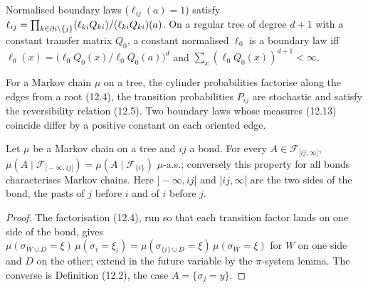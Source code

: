 \begin{proposition}[Georgii (12.15)--(12.17)]
    \label{prop:tr-12-16}
    \leanok

    Normalised boundary laws ($\ell_{ij}(a) = 1$) satisfy $\ell_{ij} = \prod_{k \in \partial i \setminus\left\{ j \right\}}(\ell_{ki}Q_{ki})/(\ell_{ki}Q_{ki})(a)$.
    On a regular tree of degree $d + 1$ with a constant transfer matrix $Q_0$, a constant
    normalised $\ell_0$ is a boundary law iff $\ell_0(x) = \bigl(\ell_0 Q_0(x)/\ell_0 Q_0(a)\bigr)^d$
    and $\sum_x (\ell_0 Q_0(x))^{d+1} < \infty$.
\end{proposition}

\begin{proposition}
    \label{prop:tr-12-3}
    \leanok

    For a Markov chain $\mu$ on a tree, the cylinder probabilities factorise along the edges
    from a root (12.4), the transition probabilities $P_{ij}$ are stochastic and satisfy the
    reversibility relation (12.5). Two boundary laws whose measures (12.13) coincide differ by a
    positive constant on each oriented edge.
\end{proposition}

\begin{proposition}[Georgii (12.3)(1)]
    \label{prop:tr-12-3-a}
    \leanok

    Let $\mu$ be a Markov chain on a tree and $ij$ a bond. For every
    $A \in \mathcal F_{]ij,\infty[}$,
    $\mu(A \mid \mathcal F_{]-\infty,ij[}) = \mu(A \mid \mathcal F_{\{i\}})$ $\mu$-a.s.;
    conversely this property for all bonds characterises Markov chains. Here
    $]-\infty,ij[$ and $]ij,\infty[$ are the two sides of the bond, the pasts of $j$ before $i$
    and of $i$ before $j$.
\end{proposition}
\begin{proof}
    \leanok
    The factorisation (12.4), run so that each transition factor lands on one side of the bond,
    gives $\mu(\sigma_{W \cup D} = \xi)\,\mu(\sigma_i = \xi_i) = \mu(\sigma_{\{i\}\cup D} = \xi)\,
    \mu(\sigma_W = \xi)$ for $W$ on one side and $D$ on the other; extend in the future variable
    by the $\pi$-system lemma. The converse is Definition (12.2), the case $A = \{\sigma_j = y\}$.
\end{proof}

